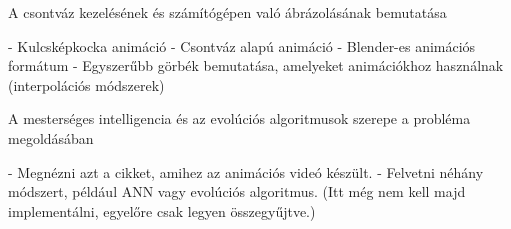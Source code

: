 \label{Chap:animacio}

A csontváz kezelésének és számítógépen való ábrázolásának bemutatása

- Kulcsképkocka animáció
- Csontváz alapú animáció
- Blender-es animációs formátum
- Egyszerűbb görbék bemutatása, amelyeket animációkhoz használnak (interpolációs módszerek)

A mesterséges intelligencia és az evolúciós algoritmusok szerepe a probléma megoldásában

- Megnézni azt a cikket, amihez az animációs videó készült.
- Felvetni néhány módszert, például ANN vagy evolúciós algoritmus. (Itt még nem kell majd implementálni, egyelőre csak legyen összegyűjtve.)
